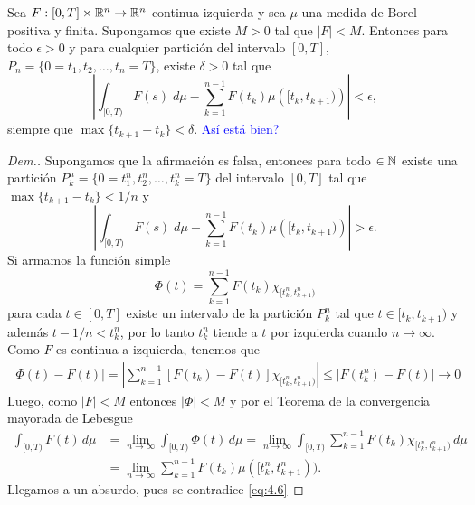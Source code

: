 \begin{thm}\label{th:R-S}
    Sea $F:[0,T]\times \mathbb{R}^n\to \mathbb{R}^n$ continua  izquierda y sea $\mu$ una medida de Borel positiva y finita. Supongamos que existe $M>0$ tal que $|F|<M$. Entonces para todo $\epsilon>0$ y para cualquier partición del intervalo $[0,T]$, $P_n=\{0=t_1, t_2, \ldots, t_n=T\}$, existe $\delta>0$ tal que 
      \begin{equation*}
    \left|\int_{[0,T)}F(s)\; d\mu - \sum_{k=1}^{n-1}F(t_k)\mu\left([t_k,t_{k+1})\right)\right|<\epsilon,
\end{equation*}   
siempre que $\max\{t_{k+1}-t_k\}<\delta$.
\textcolor{blue}{Así está bien?}
\end{thm}
\begin{proof}[Dem.]
Supongamos que la afirmación es falsa, entonces para todo $\in\mathbb{N}$ existe una partición $P^n_k=\{0=t^n_1, t^n_2, \ldots, t^n_k=T\}$ del intervalo $[0,T]$ tal que $\max\{t_{k+1}-t_k\}<1/n$ y
\begin{equation}\label{eq:4.6}
    \left|\int_{[0,T)}F(s)\; d\mu - \sum_{k=1}^{n-1}F(t_k)\mu\left([t_k,t_{k+1})\right)\right|>\epsilon.
\end{equation}    
Si armamos la función simple 
$$\Phi(t)=\sum_{k=1}^{n-1}F(t_k) \chi_{[t^n_k,t^n_{k+1})}$$
para cada $t\in[0,T]$ existe un intervalo de la partición $P^n_k$ tal que $t\in[t_k,t_{k+1})$ y además $t-1/n<t^n_k$, por lo tanto $t^n_k$ tiende a $t$ por izquierda cuando $n\to \infty$. Como $F$ es continua a izquierda, tenemos que
\begin{equation*}
\begin{split}
    |\Phi(t)-F(t)|=\left|\sum_{k=1}^{n-1}[F(t_k)-F(t)] \chi_{[t^n_k,t^n_{k+1})} \right|\leq |F(t^n_k)-F(t)|\to 0
\end{split}
\end{equation*}
Luego, como $|F|<M$ entonces $|\Phi|<M$ y por el Teorema de la convergencia mayorada de Lebesgue 
\begin{equation*}
\begin{split}
    \int_{[0,T)}F(t)\, d\mu&=\lim_{n\to \infty}\int_{[0,T)}\Phi(t)\, d\mu=\lim_{n\to \infty}\int_{[0,T)}\sum_{k=1}^{n-1}F(t_k) \chi_{[t^n_k,t^n_{k+1})}\, d\mu \\ &=\lim_{n\to \infty}\sum_{k=1}^{n-1}F(t_k) \mu([t^n_k,t^n_{k+1})).
\end{split}
\end{equation*}
Llegamos a un absurdo, pues se contradice \eqref{eq:4.6}
\end{proof}
